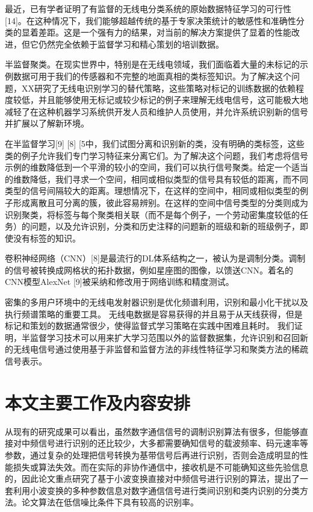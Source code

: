 最近，已有学者证明了有监督的无线电分类系统的原始数据特征学习的可行性[14]。在这种情况下，我们能够超越传统的基于专家决策统计的敏感性和准确性分类的显着差距。这是一个强有力的结果，对当前的解决方案提供了显着的性能改进，但它仍然完全依赖于监督学习和精心策划的培训数据。

半监督聚类。在现实世界中，特别是在无线电领域，我们面临着大量的未标记的示例数据可用于我们的传感器和不完整的地面真相的类标签知识。为了解决这个问题，XX研究了无线电识别学习的替代策略，这些策略对标记的训练数据的依赖程度较低，并且能够使用无标记或较少标记的例子来理解无线电信号，这可能极大地减轻了在这种机器学习系统供开发人员和维护人员使用，并允许系统识别新的信号并扩展以了解新环境。\par

在半监督学习[9] [8] [5中，我们试图分离和识别新的类，没有明确的类标签，这些类的例子允许我们专门学习特征来分离它们。为了解决这个问题，我们考虑将信号示例的维数降低到一个平滑的较小的空间，我们可以执行信号聚类。给定一个适当的维数降低，我们寻求一个空间，相同或相似类型的信号具有较低的距离，而不同类型的信号间隔较大的距离。理想情况下，在这样的空间中，相同或相似类型的例子形成离散且可分离的簇，彼此容易辨别。在这样的空间中信号类型的分类则成为识别聚类，将标签与每个聚类相关联（而不是每个例子，一个劳动密集度较低的任务）的问题，以及允许识别，分类和历史注释的问题新的班级和新的班级例子，即使没有标签的知识。\par

卷积神经网络（CNN）[8]是最流行的DL体系结构之一，被认为是调制分类。调制的信号被转换成网格状的拓扑数据，例如星座图的图像，以馈送CNN。着名的CNN模型AlexNet [9]被采纳和修改用于网络训练和精度测试。 \par

密集的多用户环境中的无线电发射器识别是优化频谱利用，识别和最小化干扰以及执行频谱策略的重要工具。 无线电数据是容易获得的并且易于从天线获得，但是标记和策划的数据通常很少，使得监督式学习策略在实践中困难且耗时。 我们证明，半监督学习技术可以用来扩大学习范围以外的监督数据集，允许识别和召回新的无线电信号通过使用基于非监督和监督方法的非线性特征学习和聚类方法的稀疏信号表示。\par


\section{本文主要工作及内容安排}
从现有的研究成果可以看出，虽然数字通信信号的调制识别算法有很多，但能够直接对中频信号进行识别的还比较少，大多都需要确知信号的载波频率、码元速率等参数，通过复杂的处理把信号转换为基带信号后再进行识别，否则会造成明显的性能损失或算法失效。而在实际的非协作通信中，接收机是不可能确知这些先验信息的，因此论文重点研究了基于小波变换直接对中频信号进行识别的算法，提出了一套利用小波变换的多种参数信息对数字通信信号进行类间识别和类内识别的分类方法。论文算法在低信噪比条件下具有较高的识别率。 \par

